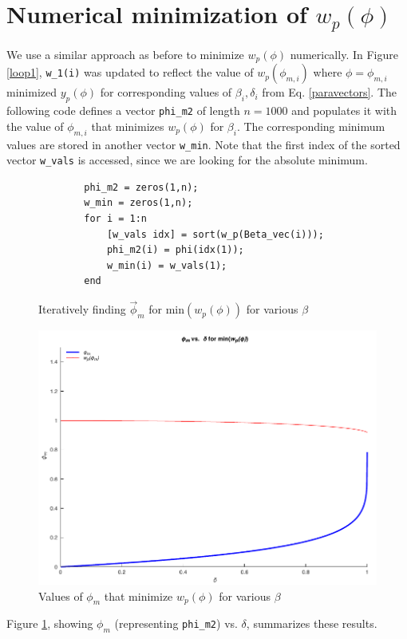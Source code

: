 \section{Numerical minimization of \texorpdfstring{$w_p(\phi)$}{}}

We use a similar approach as before to minimize $w_p(\phi)$ numerically. 
In Figure \ref{loop1}, \verb|w_1(i)| was updated
to reflect the value of $w_p(\phi_{m,i})$ where $\phi=\phi_{m,i}$ minimized $y_p(\phi)$ for corresponding values of $\beta_i,\delta_i$
from Eq. \ref{paravectors}. The following code defines a vector \verb|phi_m2| of length $n=1000$ and populates it with the value of $\phi_{m,i}$ that minimizes $w_p(\phi)$ for $\beta_i$.
The corresponding minimum values are stored in another vector \verb|w_min|. Note that the first index of the sorted vector \verb|w_vals| is accessed, since we are looking for the absolute minimum.

\begin{figure}[H]
    \begin{verbatim}
        phi_m2 = zeros(1,n);
        w_min = zeros(1,n);
        for i = 1:n
            [w_vals idx] = sort(w_p(Beta_vec(i)));
            phi_m2(i) = phi(idx(1));
            w_min(i) = w_vals(1);
        end
    \end{verbatim}
    \caption{Iteratively finding $\vec\phi_m$ for $\mathrm{min}(w_p(\phi))$ for various $\beta$}
\end{figure}

\begin{figure}[H]
    \includegraphics{plots/phi_delta_min.pdf}
    \caption{Values of $\phi_m$ that minimize $w_p(\phi)$ for various $\beta$}\label{wminplot}
\end{figure}

Figure \ref{wminplot}, showing $\phi_m$ (representing \verb|phi_m2|) vs. $\delta$, summarizes these results.